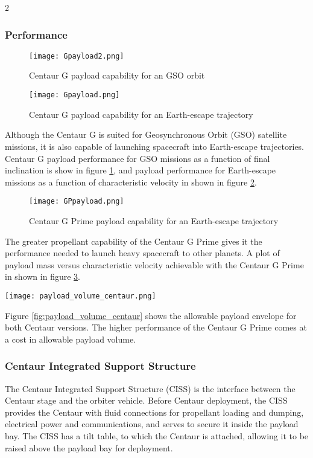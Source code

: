 \documentclass[Space_Shuttle_Vessel_Manual.tex]{subfiles}
\begin{document}
\begin{multicols*}{2}
\subsubsection{Performance}
\begin{figure}[H]
	\centering
	\captionsetup{justification=centering}
  \texttt{[image: Gpayload2.png]}
  \caption{Centaur G payload capability for an GSO orbit}
  \label{fig:Gpayload2}
\end{figure}
\begin{figure}[H]
	\centering
	\captionsetup{justification=centering}
  \texttt{[image: Gpayload.png]}
  \caption{Centaur G payload capability for an Earth-escape trajectory}
  \label{fig:Gpayload}
\end{figure}
\noindent
Although the Centaur G is suited for Geosynchronous Orbit (GSO) satellite missions, it is also capable of launching spacecraft into Earth-escape trajectories. Centaur G payload performance for GSO missions as a function of final inclination is show in figure \ref{fig:Gpayload2}, and payload performance for Earth-escape missions as a function of characteristic velocity in shown in figure \ref{fig:Gpayload}.

\begin{figure}[H]
	\centering
	\captionsetup{justification=centering}
  \texttt{[image: GPpayload.png]}
  \caption{Centaur G Prime payload capability for an Earth-escape trajectory}
  \label{fig:GPpayload}
\end{figure}
\noindent
The greater propellant capability of the Centaur G Prime gives it the performance needed to launch heavy spacecraft to other planets. A plot of payload mass versus characteristic velocity achievable with the Centaur G Prime in shown in figure \ref{fig:GPpayload}.

\begin{figure*}[ht]
  \centering
  \texttt{[image: payload\_volume\_centaur.png]}
  \caption{Centaur G and G Prime payload envelope (dimensions in meters)}
  \label{fig:payload_volume_centaur}
\end{figure*}
\noindent
Figure \ref{fig:payload_volume_centaur} shows the allowable payload envelope for both Centaur versions. The higher performance of the Centaur G Prime comes at a cost in allowable payload volume.

\subsubsection{Centaur Integrated Support Structure}
The Centaur Integrated Support Structure (CISS) is the interface between the Centaur stage and the orbiter vehicle. Before Centaur deployment, the CISS provides the Centaur with fluid connections for propellant loading and dumping, electrical power and communications, and serves to secure it inside the payload bay. The CISS has a tilt table, to which the Centaur is attached, allowing it to be raised above the payload bay for deployment.


\end{multicols*}
\end{document}
